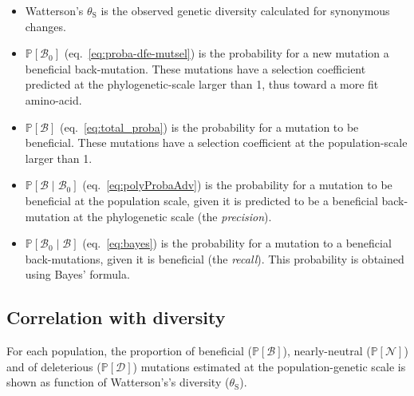 \documentclass[12pt]{article}
\newcommand{\proba}{\mathbb{P}}
\newcommand{\SphyBen}{\mathcal{B}_0}
\newcommand{\given}{\mid}
\newcommand{\SpopDel}{\mathcal{D}}
\newcommand{\SpopNeu}{\mathcal{N}}
\newcommand{\SpopBen}{\mathcal{B}}
\newcommand{\ProbaPopDel}{\proba [ \SpopDel]}
\newcommand{\ProbaPopNeu}{\proba [ \SpopNeu ]}
\newcommand{\ProbaPopBen}{\proba [ \SpopBen ]}
\newcommand{\thetaSyn}{\theta_{\text{S}}}
\begin{document}
    \begin{itemize}
        \item Watterson's $\thetaSyn$ is the observed genetic diversity calculated for synonymous changes.
        \item $\proba [ \SphyBen ]$ (eq.~\ref{eq:proba-dfe-mutsel}) is the probability for a new mutation a beneficial back-mutation.
        These mutations have a selection coefficient predicted at the phylogenetic-scale larger than 1, thus toward a more fit amino-acid.
        \item $\proba [ \SpopBen ]$ (eq.~\ref{eq:total_proba}) is the probability for a mutation to be beneficial.
        These mutations have a selection coefficient at the population-scale larger than 1.
        \item $\proba [ \SpopBen \given \SphyBen]$ (eq.~\ref{eq:polyProbaAdv}) is the probability for a mutation to be beneficial at the population scale, given it is predicted to be a beneficial back-mutation at the phylogenetic scale (the \textit{precision}).
        \item $\proba [ \SphyBen \given \SpopBen]$ (eq.~\ref{eq:bayes}) is the probability for a mutation to a beneficial back-mutations, given it is beneficial (the \textit{recall}).
        This probability is obtained using Bayes' formula.
    \end{itemize}
    \newpage

    \subsection{Correlation with diversity}
    For each population, the proportion of beneficial ($\ProbaPopBen$), nearly-neutral ($\ProbaPopNeu$) and of deleterious ($\ProbaPopDel$) mutations estimated at the population-genetic scale is shown as function of Watterson's's diversity ($\thetaSyn$).
\end{document}
